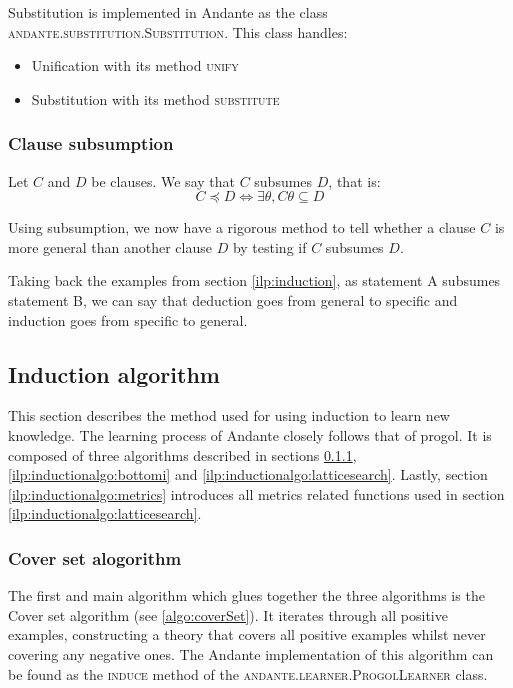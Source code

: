 \documentclass{article}
\begin{document}
Substitution is implemented in Andante as the class
\textsc{andante.substitution.Substitution}. This class handles:
\begin{itemize}
    \item Unification with its method \textsc{unify}
    \item Substitution with its method \textsc{substitute}
\end{itemize}

\subsubsection{Clause subsumption}
\label{ilp:induction:subsumption}

Let $C$ and $D$ be clauses. We say that $C$ subsumes $D$, that is:
$$C \preceq D \iff \exists \theta, C\theta \subseteq D$$

Using subsumption, we now have a rigorous method to tell whether a clause $C$
is more general than another clause $D$ by testing if $C$ subsumes $D$.

Taking back the examples from section \ref{ilp:induction}, as statement A
subsumes statement B, we can say that deduction goes from general to specific 
and induction goes from specific to general.

\subsection{Induction algorithm} \label{ilp:inductionalgo}

This section describes the method used for using induction to learn new
knowledge. The learning process of Andante closely follows that of progol. It
is composed of three algorithms described in sections
\ref{ilp:inductionalgo:coverset}, \ref{ilp:inductionalgo:bottomi} and
\ref{ilp:inductionalgo:latticesearch}. Lastly, section
\ref{ilp:inductionalgo:metrics} introduces all metrics related functions used
in section \ref{ilp:inductionalgo:latticesearch}.

\subsubsection{Cover set alogorithm} \label{ilp:inductionalgo:coverset}

The first and main algorithm which glues together the three algorithms is the
Cover set algorithm (see \ref{algo:coverSet}). It iterates through all positive
examples, constructing a theory that covers all positive examples whilst never
covering any negative ones. The Andante implementation of this algorithm can be
found as the \textsc{induce} method of the \textsc{andante.learner.ProgolLearner}
class.
\end{document}
